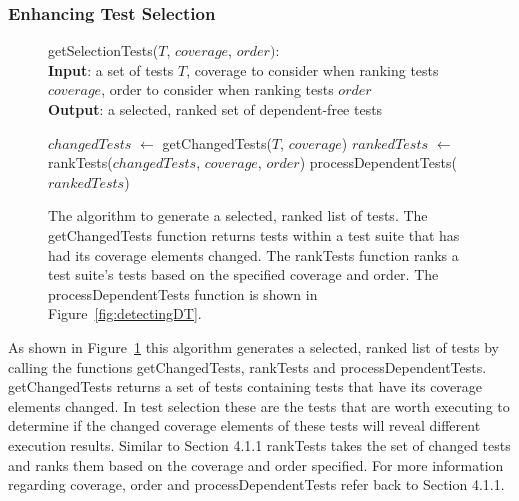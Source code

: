 \subsubsection{Enhancing Test Selection}
\begin{figure}[t]
	getSelectionTests($\mathit{T}$, $\mathit{coverage}$, $\mathit{order}):$\\
	\textbf{Input}: a set of tests $\mathit{T}$, coverage to consider when ranking tests $\mathit{coverage}$, order to consider when ranking tests $\mathit{order}$\\
	\textbf{Output}: a selected, ranked set of dependent-free tests\\
	 \begin{algorithmic}[1]
	 	\vspace{-5mm}
	 	\STATE $\mathit{changedTests}$ $\leftarrow$ getChangedTests($\mathit{T}$, $\mathit{coverage}$)
		\STATE $\mathit{rankedTests}$ $\leftarrow$ rankTests($\mathit{changedTests}$, $\mathit{coverage}$, $\mathit{order}$)
		\RETURN processDependentTests($\mathit{rankedTests}$)
	\end{algorithmic}
	\vspace{-3mm}
	\caption {
		The algorithm to generate a selected, ranked list of tests. The getChangedTests function returns tests within a test suite that has had its coverage elements changed. The rankTests function ranks a test suite's tests based on the specified coverage and order. The processDependentTests function is shown in Figure~\ref{fig:detectingDT}.
	}
	\label{fig:selection}
\end{figure}
As shown in Figure~\ref{fig:selection} this algorithm generates a selected, ranked list of tests by calling the functions getChangedTests, rankTests and processDependentTests. getChangedTests returns a set of tests containing tests that have its coverage elements changed. In test selection these are the tests that are worth executing to determine if the changed coverage elements of these tests will reveal different execution results. Similar to Section 4.1.1 rankTests takes the set of changed tests and ranks them based on the coverage and order specified. For more information regarding coverage, order and processDependentTests refer back to Section 4.1.1.

